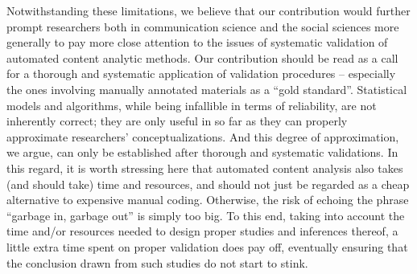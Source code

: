 \documentclass[man, 12pt, a4paper, nolmodern, noextraspace]{apa6}
\begin{document}
    Notwithstanding these limitations, we believe that our contribution would further prompt researchers both in communication science and the social sciences more generally to pay more close attention to the issues of systematic validation of automated content analytic methods. Our contribution should be read as a call for a thorough and systematic application of validation procedures -- especially the ones involving manually annotated materials as a \enquote{gold standard}. Statistical models and algorithms, while being infallible in terms of reliability, are not inherently correct; they are only useful in so far as they can properly approximate researchers' conceptualizations. And this degree of approximation, we argue, can only be established after thorough and systematic validations. In this regard, it is worth stressing here that automated content analysis also takes (and should take) time and resources, and should not just be regarded as a cheap alternative to expensive manual coding. Otherwise, the risk of echoing the phrase “garbage in, garbage out” is simply too big. To this end, taking into account the time and/or resources needed to design proper studies and inferences thereof, a little extra time spent on proper validation does pay off, eventually ensuring that the conclusion drawn from such studies do not start to stink.

    
\printbibliography
\end{document}

